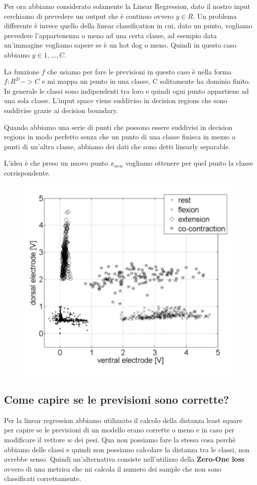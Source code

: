 \documentclass[14pt]{extreport}
\begin{document}
Per ora abbiamo considerato solamente la Linear Regression, dato il nostro input cerchiamo di prevedere un output che è continuo ovvero $y \in R$. Un
problema differente è invece quello della linear classification in cui, dato un punto, vogliamo prevedere l'appartenenza o meno ad una certa classe,
ad esempio data un'immagine vogliamo sapere se è un hot dog o meno. Quindi in questo caso abbiamo $y \in {1,...,C}$.

La funzione $f$ che usiamo per fare le previsioni in questo caso è nella forma $f:R^D->C$ e mi mappa un punto in una classe, C solitamente ha dominio
finito. In generale le classi sono indipendenti tra loro e quindi ogni punto appartiene ad una sola classe. L'input space viene suddiviso in decision
regions che sono suddivise grazie ai decision boundary.

Quando abbiamo una serie di punti che possono essere suddivisi in decision regions in modo perfetto senza che un punto di una classe finisca in mezzo
a punti di un'altra classe, abbiamo dei dati che sono detti linearly separable.

L'idea è che preso un nuovo punto $x_{new}$ vogliamo ottenere per quel punto la classe corrispondente.

\begin{figure}[H]
	\centering
	\includegraphics[width=0.4\linewidth]{141.jpeg}
\end{figure}

\subsection{Come capire se le previsioni sono corrette?}

Per la linear regression abbiamo utilizzato il calcolo della distanza least square per capire se le previsioni di un modello erano corrette o meno e
in caso per modificare il vettore $w$ dei pesi. Qua non possiamo fare la stessa cosa perchè abbiamo delle classi e quindi non possiamo calcolare la
distanza tra le classi, non avrebbe senso. Quindi un'alternativa consiste nell'utilizzo della \textbf{Zero-One loss} ovvero di una metrica che mi
calcola il numero dei sample che non sono classificati correttamente.
\end{document}
